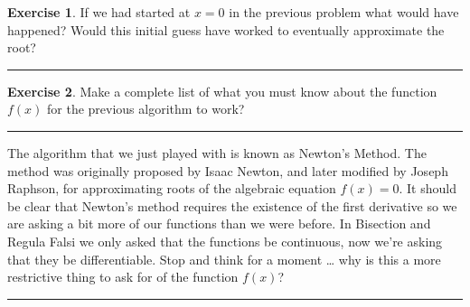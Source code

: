 \documentclass[
]{book}
\theoremstyle{definition}
\theoremstyle{definition}
\theoremstyle{definition}
\newtheorem{exercise}{Exercise}[chapter]
\theoremstyle{remark}
\begin{document}
\begin{exercise}
\protect\hypertarget{exr:unnamed-chunk-101}{}{\label{exr:unnamed-chunk-101} }If we had started at \(x=0\) in the previous problem what would have
happened? Would this initial guess have worked to eventually approximate
the root?
\end{exercise}

\begin{center}\rule{0.5\linewidth}{0.5pt}\end{center}

\begin{exercise}
\protect\hypertarget{exr:unnamed-chunk-102}{}{\label{exr:unnamed-chunk-102} }Make a complete list of what you must know about the function \(f(x)\) for
the previous algorithm to work?
\end{exercise}

\begin{center}\rule{0.5\linewidth}{0.5pt}\end{center}

The algorithm that we just played with is known as Newton's Method. The
method was originally proposed by Isaac Newton, and later modified by
Joseph Raphson, for approximating roots of the algebraic equation \(f(x)=0\). It should
be clear that Newton's method requires the existence of the first
derivative so we are asking a bit more of our functions than we were
before. In Bisection and Regula Falsi we only asked that the functions
be continuous, now we're asking that they be differentiable. Stop and think for a moment \ldots{} why is this a more restrictive thing to ask for of the function \(f(x)\)?

\begin{center}\rule{0.5\linewidth}{0.5pt}\end{center}
\end{document}
